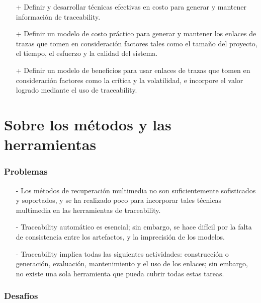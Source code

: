 \documentclass[a4paper,12pt,oneside,spanish]{book}
\begin{document}
\begin{itemize}

\item[+] Definir y desarrollar técnicas efectivas en costo para generar y mantener información de traceability.

\item[+] Definir un modelo de costo práctico para generar y mantener los enlaces de trazas que tomen en consideración factores tales como el tamaño del proyecto, el tiempo, el esfuerzo y la calidad del sistema.

\item[+] Definir un modelo de beneficios para usar enlaces de trazas que tomen en consideración factores como la crítica y la volatilidad, e incorpore el valor logrado mediante el uso de traceability.

\end{itemize}

\section{Sobre los métodos y las herramientas}

\subsubsection{Problemas}

\begin{itemize}

\item[-] Los métodos de recuperación multimedia no son suficientemente sofisticados y soportados, y se ha realizado poco para incorporar tales técnicas multimedia en las herramientas de traceability.

\item[-] Traceability automático es esencial; sin embargo, se hace difícil por la falta de consistencia entre los artefactos, y la imprecisión de los modelos.

\item[-] Traceability implica todas las siguientes actividades: construcción o generación, evaluación, mantenimiento y el uso de los enlaces; sin embargo, no existe una sola herramienta que pueda cubrir todas estas tareas.

\end{itemize}

\subsubsection{Desafíos}
\end{document}
